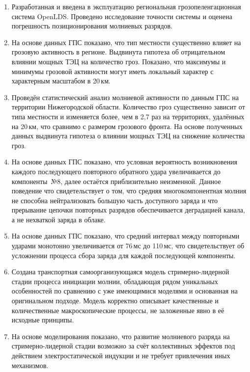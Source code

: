 \begin{enumerate}
	\item Разработанная и введена в эксплуатацию региональная грозопеленгационная система OpenLDS. Проведено исследование точности системы и оценена погрешность позиционирования молниевых разрядов.
	
	\item На основе данных ГПС показано, что тип местности существенно влияет на грозовую активность в регионе. Выдвинута гипотеза об отрицательном влиянии мощных ТЭЦ на количество гроз. Показано, что максимумы и минимумы грозовой активности могут иметь локальный характер с характерным масштабом в 20\,км.	
	
	\item Проведён статистический анализ молниевой активности по данным ГПС на территории Нижегородской области. Количество гроз существенно зависит от типа местности и изменяется более, чем в 2,7 раз на территориях, удалённых на 20\,км, что сравнимо с размером грозового фронта. На основе полученных данных выдвинута гипотеза о влиянии мощных ТЭЦ на снижение количества гроз.
	
	\item На основе данных ГПС показано, что условная вероятность возникновения каждого последующего повторного обратного удара увеличивается до компоненты~№8, далее остаётся приблизительно неизменной. Данное поведение что свидетельствует о том, что средняя многокомпонентная молния не способна нейтрализовать большую часть доступного заряда и что прерывание цепочки повторных разрядов обеспечивается деградацией канала, а не нехваткой заряда в облаке.
	
	\item На основе данных ГПС показано, что средний интервал между повторными ударами монотонно увеличивается от 76\,мс до 110\,мс, что свидетельствует об усложнении процесса сбора заряда для каждой последующей компоненты.	
	
	\item Создана транспортная самоорганизующаяся модель стримерно-лидерной стадии процесса инициации молнии, обладающая рядом уникальных особенностей по сравнению с уже имеющимися моделями и основанная на оригинальном подходе. Модель корректно описывает качественные и количественные макроскопические процессы, не заложенные явно в её исходные принципы.
	
	\item На основе моделирования показано, что развитие молниевого разряда на стримерно-лидерной стадии возможно за счёт коллективных эффектов под действием электростатической индукции и не требует привлечения иных механизмов.	
\end{enumerate}